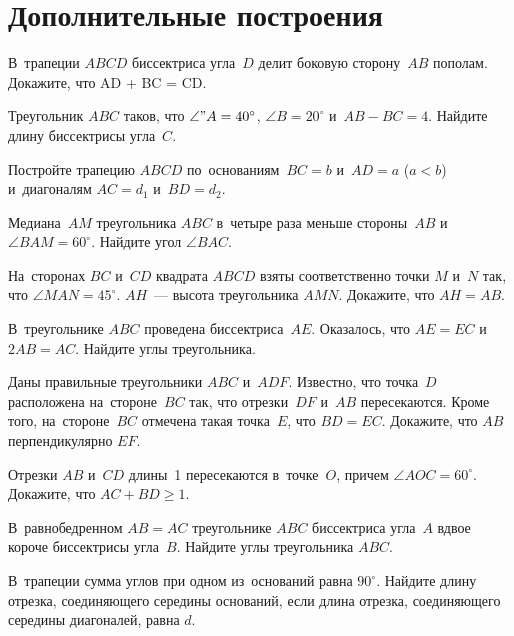 
\section*{Дополнительные построения}


\begin{problems}

\item
В~трапеции $ABCD$ биссектриса угла~$D$ делит боковую сторону~$AB$ пополам.
Докажите, что AD + BC = CD.

\item
Треугольник $ABC$ таков, что $\angle "A = 40^\circ$, $\angle B = 20^\circ$
и~$AB - BC = 4$.
Найдите длину биссектрисы угла~$C$.

\item
Постройте трапецию $ABCD$ по~основаниям~$BC = b$ и~$AD = a$ ($a < b$)
и~диагоналям $AC = d_1$ и~$BD = d_2$.

\item
Медиана~$AM$ треугольника $ABC$ в~четыре раза меньше стороны~$AB$
и~$\angle BAM = 60^\circ$.
Найдите угол $\angle BAC$.

\item
На~сторонах $BC$ и~$CD$ квадрата $ABCD$ взяты соответственно точки $M$ и~$N$
так, что $\angle MAN = 45^\circ$.
$AH$~--- высота треугольника $AMN$.
Докажите, что $AH = AB$.

\item
В~треугольнике $ABC$ проведена биссектриса~$AE$.
Оказалось, что $AE = EC$ и~$2 AB = AC$.
Найдите углы треугольника.

\item
Даны правильные треугольники $ABC$ и~$ADF$.
Известно, что точка~$D$ расположена на~стороне~$BC$ так, что отрезки~$DF$
и~$AB$ пересекаются.
Кроме того, на~стороне~$BC$ отмечена такая точка~$E$, что $BD = EC$.
Докажите, что $AB$ перпендикулярно $EF$.

\item
Отрезки $AB$ и~$CD$ длины~1 пересекаются в~точке~$O$, причем
$\angle AOC = 60^\circ$.
Докажите, что $AC + BD \geq 1$.

\item
В~равнобедренном $AB = AC$ треугольнике $ABC$ биссектриса угла~$A$ вдвое
короче биссектрисы угла~$B$.
Найдите углы треугольника $ABC$.

\item
В~трапеции сумма углов при одном из~оснований равна $90^\circ$.
Найдите длину отрезка, соединяющего середины оснований, если длина отрезка,
соединяющего середины диагоналей, равна $d$.

\end{problems}

